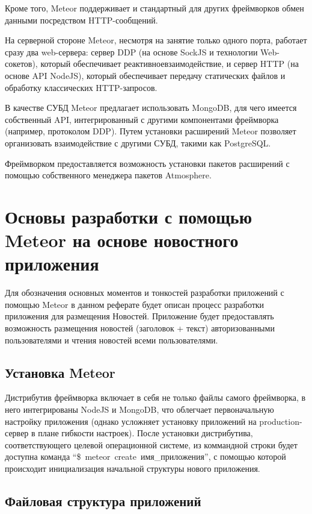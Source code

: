 \documentclass[a4paper,12pt]{article}
\begin{document}
Кроме того, Meteor поддерживает и стандартный для других фреймворков обмен данными
посредством HTTP-сообщений.

На серверной стороне Meteor, несмотря на занятие только одного порта,
работает сразу два web-сервера: сервер DDP (на основе SockJS и технологии
Web-сокетов), который обеспечивает реактивноевзаимодействие, и сервер HTTP (на
основе API NodeJS), который обеспечивает передачу статических файлов и
обработку классических HTTP-запросов.

В качестве СУБД Meteor предлагает использовать MongoDB, для чего имеется
собственный API, интегрированный с другими компонентами фреймворка (например,
протоколом DDP). Путем установки расширений Meteor позволяет организовать 
взаимодействие с другими СУБД, такими как PostgreSQL.

Фреймворком предоставляется возможность установки пакетов расширений
с помощью собственного менеджера пакетов Atmosphere.

\section{Основы разработки с помощью Meteor на основе новостного приложения}
Для обозначения основных моментов и тонкостей разработки приложений с помощью
Meteor в данном реферате будет описан процесс разработки приложения для размещения
Новостей. Приложение будет предоставлять возможность размещения новостей
(заголовок + текст) авторизованными пользователями и чтения новостей
всеми пользователями.

\subsection{Установка Meteor}

Дистрибутив фреймворка включает в себя не только файлы самого фреймворка, 
в него интегрированы NodeJS и MongoDB, что облегчает
первоначальную настройку приложения (однако усложняет установку приложений 
на production-сервер в плане гибкости настроек). После
установки дистрибутива, соответствующего целевой операционной системе,
из коммандной строки будет доступна команда ``\$~meteor~create~имя\_приложения'',
с помощью которой происходит инициализация начальной структуры нового приложения.

\subsection{Файловая структура приложений}
\end{document}
